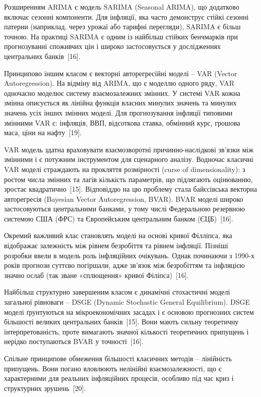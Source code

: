 \documentclass{bachelor_thesis}
\begin{document}
Розширенням ARIMA є модель SARIMA (Seasonal ARIMA), що додатково включає сезонні компоненти. Для інфляції, яка часто демонструє стійкі сезонні патерни (наприклад, через урожаї або тарифні перегляди), SARIMA є більш точною. На практиці SARIMA є одним із найбільш стійких бенчмарків при прогнозуванні споживчих цін і широко застосовується у дослідженнях центральних банків~[16].

Принципово іншим класом є векторні авторегресійні моделі -- VAR (Vector Autoregression). На відміну від ARIMA, що є моделлю одного ряду, VAR одночасно моделює систему взаємозалежних змінних. У системі VAR кожна змінна описується як лінійна функція власних минулих значень та минулих значень усіх інших змінних моделі. Для прогнозування інфляції типовими змінними VAR є: інфляція, ВВП, відсоткова ставка, обмінний курс, грошова маса, ціни на нафту~[19].

VAR модель здатна враховувати взаємозворотні причинно-наслідкові зв'язки між змінними і є потужним інструментом для сценарного аналізу. Водночас класичні VAR моделі страждають на прокляття розмірності (curse of dimensionality): з ростом числа змінних та лагів кількість параметрів, що підлягають оцінюванню, зростає квадратично~[15]. Відповіддю на цю проблему стала байєсівська векторна авторегресія (Bayesian Vector Autoregression, BVAR). BVAR моделі широко застосовуються центральними банками, у тому числі Федеральною резервною системою США (ФРС) та Європейським центральним банком (ЄЦБ)~[16].

Окремий важливий клас становлять моделі на основі кривої Філліпса, яка відображає залежність між рівнем безробіття та рівнем інфляції. Пізніші розробки ввели в модель роль інфляційних очікувань. Однак починаючи з 1990-х років прогнози суттєво погіршали, адже зв'язок між безробіттям та інфляцією значно ослаб (так зване «сплющення» кривої Філіпса)~[16].

Найбільш структурно завершеним класом є динамічні стохастичні моделі загальної рівноваги -- DSGE (Dynamic Stochastic General Equilibrium). DSGE моделі ґрунтуються на мікроекономічних засадах і є основою прогнозних систем більшості великих центральних банків~[15]. Вони мають сильну теоретичну інтерпретованість, проте вимагають значної кількості теоретичних припущень і нерідко поступаються BVAR у точності~[16].

Спільне принципове обмеження більшості класичних методів -- лінійність припущень. Вони погано вловлюють нелінійні взаємозалежності, що є характерними для реальних інфляційних процесів, особливо під час криз і структурних зрушень~[20].
\end{document}
